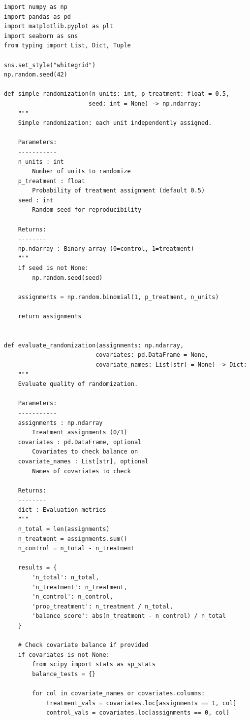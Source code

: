 \lstset{language=Python, caption=Simple Randomization Implementation, label=lst:simple_random}
\begin{lstlisting}
import numpy as np
import pandas as pd
import matplotlib.pyplot as plt
import seaborn as sns
from typing import List, Dict, Tuple

sns.set_style("whitegrid")
np.random.seed(42)

def simple_randomization(n_units: int, p_treatment: float = 0.5,
                        seed: int = None) -> np.ndarray:
    """
    Simple randomization: each unit independently assigned.

    Parameters:
    -----------
    n_units : int
        Number of units to randomize
    p_treatment : float
        Probability of treatment assignment (default 0.5)
    seed : int
        Random seed for reproducibility

    Returns:
    --------
    np.ndarray : Binary array (0=control, 1=treatment)
    """
    if seed is not None:
        np.random.seed(seed)

    assignments = np.random.binomial(1, p_treatment, n_units)

    return assignments


def evaluate_randomization(assignments: np.ndarray,
                          covariates: pd.DataFrame = None,
                          covariate_names: List[str] = None) -> Dict:
    """
    Evaluate quality of randomization.

    Parameters:
    -----------
    assignments : np.ndarray
        Treatment assignments (0/1)
    covariates : pd.DataFrame, optional
        Covariates to check balance on
    covariate_names : List[str], optional
        Names of covariates to check

    Returns:
    --------
    dict : Evaluation metrics
    """
    n_total = len(assignments)
    n_treatment = assignments.sum()
    n_control = n_total - n_treatment

    results = {
        'n_total': n_total,
        'n_treatment': n_treatment,
        'n_control': n_control,
        'prop_treatment': n_treatment / n_total,
        'balance_score': abs(n_treatment - n_control) / n_total
    }

    # Check covariate balance if provided
    if covariates is not None:
        from scipy import stats as sp_stats
        balance_tests = {}

        for col in covariate_names or covariates.columns:
            treatment_vals = covariates.loc[assignments == 1, col]
            control_vals = covariates.loc[assignments == 0, col]


\end{lstlisting}
